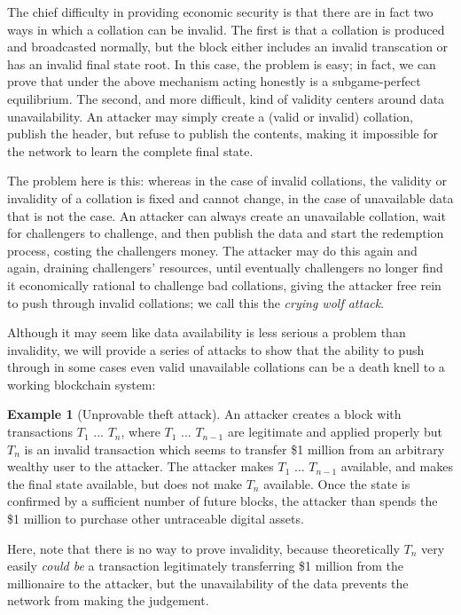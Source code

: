 \documentclass[11pt,a4paper]{article}
\theoremstyle{plain}
\theoremstyle{definition}
\newtheorem{exmp}{Example}[section]
\theoremstyle{remark}
\begin{document}
The chief difficulty in providing economic security is that there are in fact two ways in which a collation can be invalid. The first is that a collation is produced and broadcasted normally, but the block either includes an invalid transcation or has an invalid final state root. In this case, the problem is easy; in fact, we can prove that under the above mechanism acting honestly is a subgame-perfect equilibrium. The second, and more difficult, kind of validity centers around data unavailability. An attacker may simply create a (valid or invalid) collation, publish the header, but refuse to publish the contents, making it impossible for the network to learn the complete final state.

The problem here is this: whereas in the case of invalid collations, the validity or invalidity of a collation is fixed and cannot change, in the case of unavailable data that is not the case. An attacker can always create an unavailable collation, wait for challengers to challenge, and then publish the data and start the redemption process, costing the challengers money. The attacker may do this again and again, draining challengers' resources, until eventually challengers no longer find it economically rational to challenge bad collations, giving the attacker free rein to push through invalid collations; we call this the \emph{crying wolf attack}.

Although it may seem like data availability is less serious a problem than invalidity, we will provide a series of attacks to show that the ability to push through in some cases even valid unavailable collations can be a death knell to a working blockchain system:

\begin{exmp}[Unprovable theft attack]
An attacker creates a block with transactions $T_1$ ... $T_n$, where $T_1$ ... $T_{n-1}$ are legitimate and applied properly but $T_n$ is an invalid transaction which seems to transfer \$1 million from an arbitrary wealthy user to the attacker. The attacker makes $T_1$ ... $T_{n-1}$ available, and makes the final state available, but does not make $T_n$ available. Once the state is confirmed by a sufficient number of future blocks, the attacker than spends the \$1 million to purchase other untraceable digital assets.

Here, note that there is no way to prove invalidity, because theoretically $T_n$ very easily \emph{could be} a transaction legitimately transferring \$1 million from the millionaire to the attacker, but the unavailability of the data prevents the network from making the judgement.
\end{exmp}
\end{document}
